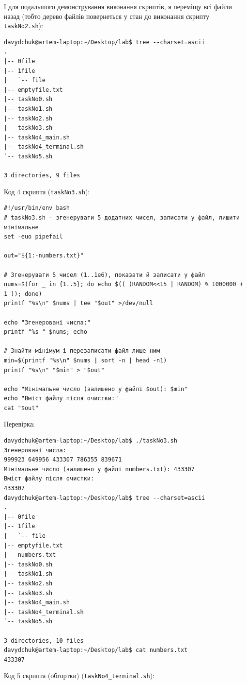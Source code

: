 \documentclass[a4paper,12pt]{article}
\begin{document}
    І для подальшого демонстрування виконання скриптів, я переміщу всі файли назад (тобто дерево файлів повернеться у стан до виконання скрипту \texttt{taskNo2.sh}):

    \begin{verbatim}
davydchuk@artem-laptop:~/Desktop/lab$ tree --charset=ascii
.
|-- 0file
|-- 1file
|   `-- file
|-- emptyfile.txt
|-- taskNo0.sh
|-- taskNo1.sh
|-- taskNo2.sh
|-- taskNo3.sh
|-- taskNo4_main.sh
|-- taskNo4_terminal.sh
`-- taskNo5.sh

3 directories, 9 files
    \end{verbatim}

    Код 4 скрипта (\texttt{taskNo3.sh}):

    \begin{verbatim}
#!/usr/bin/env bash
# taskNo3.sh - згенерувати 5 додатних чисел, записати у файл, лишити мінімальне
set -euo pipefail

out="${1:-numbers.txt}"

# Згенерувати 5 чисел (1..1e6), показати й записати у файл
nums=$(for _ in {1..5}; do echo $(( (RANDOM<<15 | RANDOM) % 1000000 + 1 )); done)
printf "%s\n" $nums | tee "$out" >/dev/null

echo "Згенеровані числа:"
printf "%s " $nums; echo

# Знайти мінімум і перезаписати файл лише ним
min=$(printf "%s\n" $nums | sort -n | head -n1)
printf "%s\n" "$min" > "$out"

echo "Мінімальне число (залишено у файлі $out): $min"
echo "Вміст файлу після очистки:"
cat "$out"
    \end{verbatim}

    Перевірка:
    \begin{verbatim}
davydchuk@artem-laptop:~/Desktop/lab$ ./taskNo3.sh
Згенеровані числа:
999923 649956 433307 786355 839671 
Мінімальне число (залишено у файлі numbers.txt): 433307
Вміст файлу після очистки:
433307
davydchuk@artem-laptop:~/Desktop/lab$ tree --charset=ascii
.
|-- 0file
|-- 1file
|   `-- file
|-- emptyfile.txt
|-- numbers.txt
|-- taskNo0.sh
|-- taskNo1.sh
|-- taskNo2.sh
|-- taskNo3.sh
|-- taskNo4_main.sh
|-- taskNo4_terminal.sh
`-- taskNo5.sh

3 directories, 10 files
davydchuk@artem-laptop:~/Desktop/lab$ cat numbers.txt
433307
    \end{verbatim}

    Код 5 скрипта (обгортки) (\texttt{taskNo4\_terminal.sh}):
\end{document}
